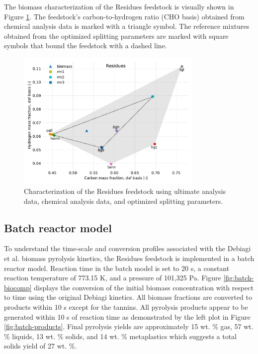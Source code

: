 The biomass characterization of the Residues feedstock is visually shown in Figure \ref{fig:biocomp-diagram}. The feedstock's carbon-to-hydrogen ratio (CHO basis) obtained from chemical analysis data is marked with a triangle symbol. The reference mixtures obtained from the optimized splitting parameters are marked with square symbols that bound the feedstock with a dashed line.

\begin{figure}[H]
    \centering
    \includegraphics[width=0.8\textwidth]{figures/biocomp-diagram.pdf}
    \caption{Characterization of the Residues feedstock using ultimate analysis data, chemical analysis data, and optimized splitting parameters.}
    \label{fig:biocomp-diagram}
\end{figure}

\subsection{Batch reactor model}

To understand the time-scale and conversion profiles associated with the Debiagi et al. biomass pyrolysis kinetics, the Residues feedstock is implemented in a batch reactor model. Reaction time in the batch model is set to 20 s, a constant reaction temperature of 773.15 K, and a pressure of 101,325 Pa. Figure \ref{fig:batch-biocomp} displays the conversion of the initial biomass concentration with respect to time using the original Debiagi kinetics. All biomass fractions are converted to products within 10 s except for the tannins. All pyrolysis products appear to be generated within 10 s of reaction time as demonstrated by the left plot in Figure \ref{fig:batch-products}. Final pyrolysis yields are approximately 15 wt. \% gas, 57 wt. \% liquids, 13 wt. \% solids, and 14 wt. \% metaplastics which suggests a total solids yield of 27 wt. \%.

